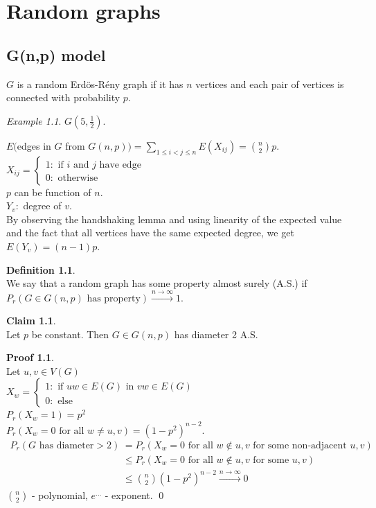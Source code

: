 \documentclass[a4paper, 12pt]{book}
\theoremstyle{definition}
\newtheorem{defn}[counter]{Definition}
\newtheorem{claim}[counter]{Claim}
\newtheorem{pro}[counter]{Proof}
\theoremstyle{remark}
\newtheorem*{ex}{Example}
\begin{document}
\chapter{Random graphs}


\section{G(n,p) model}

$G$ is a random Erdös-Rény graph if it has $n$ vertices and each pair of vertices is connected with probability $p$.
\begin{ex}
  $G\left(5, \frac{1}{2}\right)$.
\end{ex}
$E($edges in $G$ from $G(n,p)) = \sum_{1 \leq i < j \leq n} E(X_{ij}) = \binom{n}{2} p$. \\
$X_{ij} = \begin{cases}
  1: \text{ if } i \text{ and } j \text{ have edge} \\
  0: \text{ otherwise}
\end{cases}$ \\
$p$ can be function of $n$. \\
$Y_v:$ degree of $v$. \\
By observing the handshaking lemma and using linearity of the expected value and the fact that all vertices have the same expected degree, we get $E(Y_v) = (n-1)p$.
\begin{defn} \text{} \\
  We say that a random graph has some property almost surely (A.S.) if \\
  $P_r(G \in G(n,p) \text{ has property}) \stackrel{n \to \infty}{\longrightarrow} 1$.
\end{defn}
\begin{claim} \text{} \\
  Let $p$ be constant.
  Then $G \in G(n,p)$ has diameter 2 A.S.
\end{claim}
\begin{pro} \text{} \\
  Let $u,v \in V(G)$ \\
  $X_w = \begin{cases}
    1: \text{ if } uw \in E(G) \text{ in } vw \in E(G) \\
    0: \text{ else}
  \end{cases}$ \\
  $P_r(X_w = 1) = p^2$ \\
  $P_r(X_w = 0 \text{ for all } w \neq u,v) = \left(1-p^2\right)^{n-2}$. \\
  \begin{align*}
    P_r(G \text{ has diameter} > 2) &= P_r(X_w = 0 \text{ for all } w \notin u,v  \text{ for some non-adjacent } u,v) \\
    &\leq P_r(X_w = 0 \text{ for all } w \notin u,v  \text{ for some } u,v) \\
    &\leq \binom{n}{2} (1-p^2)^{n-2} \stackrel{n \to \infty}{\longrightarrow} 0
  \end{align*}
  $\binom{n}{2}$ - polynomial, $e^{\dots}$ - exponent.
  \qed
\end{pro}
\end{document}

